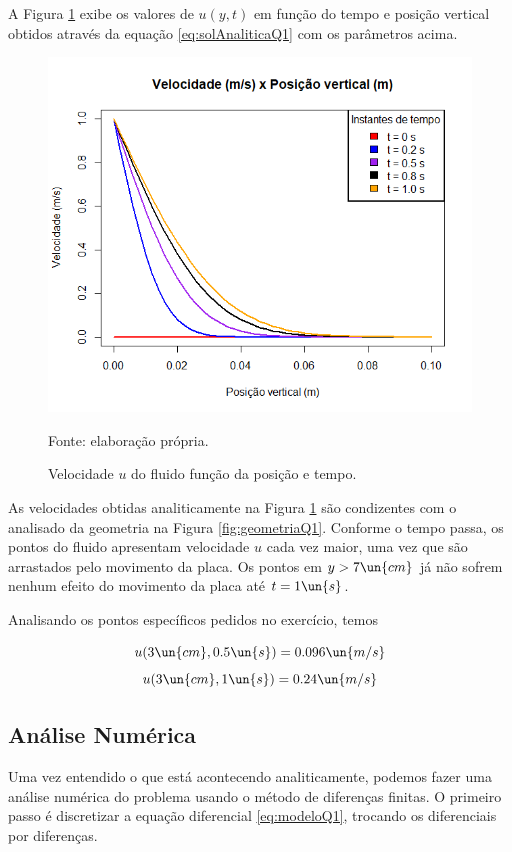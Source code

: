 A Figura \ref*{fig:velocidadesAnaliticaQ1}
exibe os valores de $u(y,t)$ em função do tempo e posição vertical obtidos através da equação
\eqref{eq:solAnaliticaQ1} com os parâmetros acima.

\begin{figure}[h!]
    \caption{Velocidade $u$ do fluido função da posição e tempo.}
    \label{fig:velocidadesAnaliticaQ1}
    \centering
    \centerline{\includegraphics[scale=0.5]{velocidadesAnaltico.png}}
    \par{Fonte: elaboração própria.}
\end{figure}

As velocidades obtidas analiticamente na Figura \ref*{fig:velocidadesAnaliticaQ1} são condizentes
com o analisado da geometria na Figura \ref*{fig:geometriaQ1}. Conforme o tempo passa,
os pontos do fluido apresentam velocidade $u$ cada vez maior, uma vez que são arrastados
pelo movimento da placa. Os pontos em $y > 7 \un{cm}$ já não sofrem nenhum efeito
do movimento da placa até $t = 1 \un{s}$.

Analisando os pontos específicos pedidos no exercício, temos

\[ u(3 \un{cm}, 0.5 \un{s}) = 0.096 \un{m/s} \]
\[ u(3 \un{cm}, 1 \un{s}) = 0.24 \un{m/s} \]

\subsection{Análise Numérica}

Uma vez entendido o que está acontecendo analiticamente, podemos fazer uma análise
numérica do problema usando o método de diferenças finitas. O primeiro passo
é discretizar a equação diferencial \eqref{eq:modeloQ1}, trocando os diferenciais
por diferenças.

